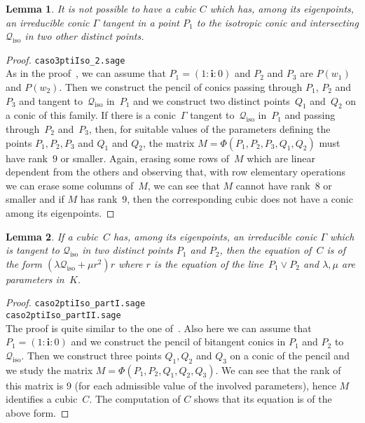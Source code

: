 \documentclass{amsart}
\theoremstyle{plain}
\newtheorem{lemma}{Lemma}[section]
\theoremstyle{definition}
\newcommand{\iso}{\mathcal{Q}_{\mathrm{iso}}}
\newcommand{\iii}{\textbf{i}}
\begin{document}
\begin{lemma}
\label{lemma3ptiSuCiso}
It is not possible to have a cubic $C$ which has, among its eigenpoints,
an irreducible conic $\Gamma$ tangent in a point $P_1$ to the isotropic
conic and intersecting $\iso$ in two other distinct points.
\end{lemma}
\begin{proof}
\verb+caso3ptiIso_2.sage+\\
As in the proof~, we can assume that
$P_1 = (1: \iii: 0)$
and $P_2$ and $P_3$ are $P(w_1)$ and $P(w_2)$. Then we construct
the pencil of conics passing through $P_1$, $P_2$ and $P_3$ and
tangent to~$\iso$ in~$P_1$ and we construct two distinct points~$Q_1$ and~$Q_2$ on a conic of this family. If there is a conic~$\Gamma$
tangent to~$\iso$ in~$P_1$ and passing through~$P_2$ and~$P_3$,
then, for suitable values of the parameters defining the points
$P_1, P_2, P_3$ and $Q_1$ and $Q_2$, the matrix
$M = \Phi(P_1, P_2, P_3, Q_1, Q_2)$
must have rank~$9$ or smaller. Again, erasing some rows of~$M$
which are linear dependent from the others and observing that,
with row elementary operations we can erase some columns of~$M$,
we can see that $M$ cannot have rank~$8$ or smaller and if $M$
has rank~$9$, then the corresponding cubic does not have a conic
among its eigenpoints.
\end{proof}

\begin{lemma}
\label{lemma:bitangentToCiso}
If a cubic~$C$ has, among its eigenpoints, an irreducible conic $\Gamma$
which is tangent to $\iso$ in two distinct points $P_1$ and $P_2$, then
the equation of~$C$ is of the form $(\lambda \iso + \mu r^2)r$ where
$r$ is the equation of the line~$P_1\vee P_2$ and $\lambda, \mu$ are parameters
in~$K$.
\end{lemma}
\begin{proof}
\verb+caso2ptiIso_partI.sage+\\
\verb+caso2ptiIso_partII.sage+\\
The proof is quite similar to the one of~. Also
here we can assume that $P_1 = (1: \iii: 0)$ and we construct the pencil of
bitangent conics in $P_1$ and $P_2$ to $\iso$. Then we construct three
points $Q_1, Q_2$ and $Q_3$ on a conic of the pencil
and we study the matrix $M = \Phi(P_1, P_2, Q_1, Q_2, Q_3)$. We can see
that the rank of this matrix is $9$ (for each admissible value of the
involved parameters), hence $M$ identifies a cubic~$C$. The computation
of $C$ shows that its equation is of the above form.
\end{proof}
\end{document}
